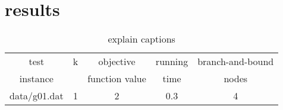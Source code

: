 \section{results}


\begin{table} 
\small
\centering
\begin{tabular}{ccccc}
\hline
test     & k & objective      & running & branch-and-bound \\
instance &   & function value & time    & nodes \\
\hline
data/g01.dat 	& 1 & 2 & 0.3 & 4 \\

\hline
\end{tabular}
\caption{explain captions}
\label{tbl:REPLACEME}
\end{table}
